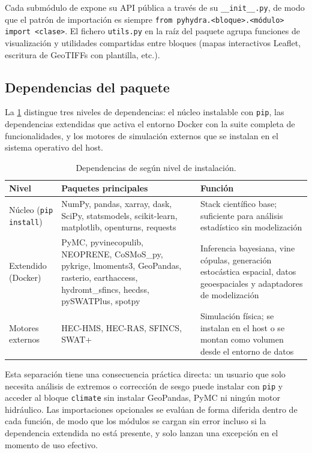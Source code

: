 Cada submódulo de \pyhydra expone su API pública a través de su \texttt{\_\_init\_\_.py}, de modo que el patrón de importación es siempre \texttt{from pyhydra.\allowbreak<bloque>.\allowbreak<módulo> import <clase>}. El fichero \texttt{utils.py} en la raíz del paquete agrupa funciones de visualización y utilidades compartidas entre bloques (mapas interactivos Leaflet, escritura de GeoTIFFs con plantilla, etc.).

\subsection{Dependencias del paquete}
\label{subsec:dependencias}

La \cref{tab:dependencias} distingue tres niveles de dependencias: el núcleo instalable con \texttt{pip}, las dependencias extendidas que activa el entorno Docker con la suite completa de funcionalidades, y los motores de simulación externos que se instalan en el sistema operativo del host.

\begin{table}[htbp]
  \centering
  \small
  \caption{Dependencias de \pyhydra según nivel de instalación.}
  \label{tab:dependencias}
  \begin{tabular}{p{}p{}p{}}
    \toprule
    Nivel & Paquetes principales & Función \\
    \midrule
    Núcleo (\texttt{pip install}) & NumPy, pandas, xarray, dask, SciPy, statsmodels, scikit-learn, matplotlib, openturns, requests & Stack científico base; suficiente para análisis estadístico sin modelización \\[4pt]
    Extendido (Docker) & PyMC, pyvinecopulib, NEOPRENE, CoSMoS\_py, pykrige, lmoments3, GeoPandas, rasterio, earthaccess, hydromt\_sfincs, hecdss, pySWATPlus, spotpy & Inferencia bayesiana, vine cópulas, generación estocástica espacial, datos geoespaciales y adaptadores de modelización \\[4pt]
    Motores externos & HEC-HMS, HEC-RAS, SFINCS, SWAT+ & Simulación física; se instalan en el host o se montan como volumen desde el entorno de datos \\
    \bottomrule
  \end{tabular}
\end{table}

Esta separación tiene una consecuencia práctica directa: un usuario que solo necesita análisis de extremos o corrección de sesgo puede instalar \pyhydra con \texttt{pip} y acceder al bloque \texttt{climate} sin instalar GeoPandas, PyMC ni ningún motor hidráulico. Las importaciones opcionales se evalúan de forma diferida dentro de cada función, de modo que los módulos se cargan sin error incluso si la dependencia extendida no está presente, y solo lanzan una excepción en el momento de uso efectivo.

